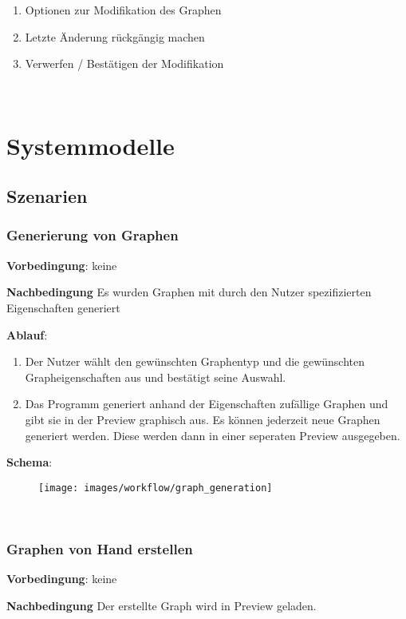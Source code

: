 \documentclass{article}
\begin{document}
	\FloatBarrier
	
	\begin{enumerate}[(1)]
		\item{Optionen zur Modifikation des Graphen}
		\item{Letzte Änderung rückgängig machen}
		\item{Verwerfen / Bestätigen der Modifikation}
	\end{enumerate}
	
	~\newpage
	\section{Systemmodelle}
	\subsection{Szenarien}
	
	\subsubsection{Generierung von Graphen}
	\textbf{Vorbedingung}: keine
	
	\textbf{Nachbedingung} Es wurden Graphen mit durch den Nutzer spezifizierten Eigenschaften generiert
	
	\textbf{Ablauf}:
	\begin{enumerate}[1)]
		\item{Der Nutzer wählt den gewünschten Graphentyp und die gewünschten Grapheigenschaften aus und bestätigt seine Auswahl.}
		\item{Das Programm generiert anhand der Eigenschaften zufällige Graphen und gibt sie in der Preview graphisch aus. Es können jederzeit neue Graphen generiert werden. Diese werden dann in einer seperaten Preview ausgegeben.}
	\end{enumerate}
	
	\textbf{Schema}:
	~\begin{figure}[!h]
		\centering
		\texttt{[image: images/workflow/graph\_generation]}
	\end{figure}
	
	
	\FloatBarrier
	~\newpage
	\subsubsection{Graphen von Hand erstellen}
	\textbf{Vorbedingung}: keine
	
	\textbf{Nachbedingung} Der erstellte Graph wird in Preview geladen.
	
\end{document}
